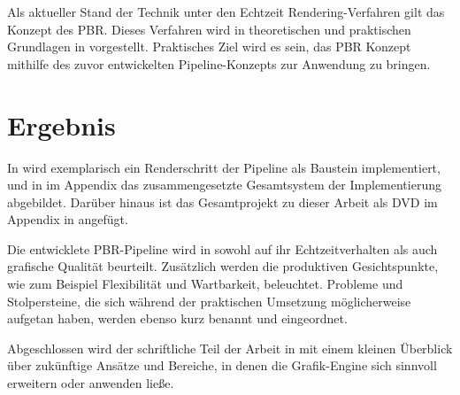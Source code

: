 Als aktueller Stand der Technik unter den Echtzeit Rendering-Verfahren gilt das Konzept des \acl{PBR}. Dieses Verfahren wird in theoretischen und praktischen Grundlagen in  vorgestellt. Praktisches Ziel wird es sein, das \ac{PBR} Konzept mithilfe des zuvor entwickelten Pipeline-Konzepts zur Anwendung zu bringen.

\section{Ergebnis}
In  wird exemplarisch ein Renderschritt der Pipeline als Baustein implementiert, und in  im Appendix das zusammengesetzte Gesamtsystem der Implementierung abgebildet. Darüber hinaus ist das Gesamtprojekt zu dieser Arbeit als DVD im Appendix in  angefügt.

Die entwicklete \ac{PBR}-Pipeline wird in  sowohl auf ihr Echtzeitverhalten als auch grafische Qualität beurteilt. Zusätzlich werden die produktiven Gesichtspunkte, wie zum Beispiel Flexibilität und Wartbarkeit, beleuchtet. Probleme und Stolpersteine, die sich während der praktischen Umsetzung möglicherweise aufgetan haben, werden ebenso kurz benannt und eingeordnet.

Abgeschlossen wird der schriftliche Teil der Arbeit in  mit einem kleinen Überblick über zukünftige Ansätze und Bereiche, in denen die Grafik-Engine sich sinnvoll erweitern oder anwenden ließe.

